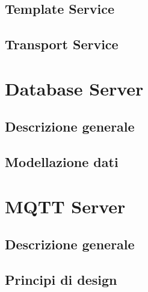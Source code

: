 \subsection{Template Service}

\subsection{Transport Service}



\section{Database Server}
\subsection{Descrizione generale}

\subsection{Modellazione dati}


\section{MQTT Server}
\subsection{Descrizione generale}

\subsection{Principi di design}



